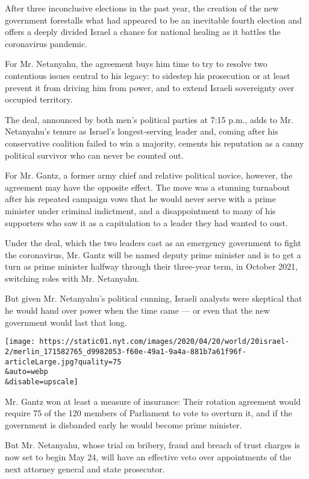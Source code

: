 After three inconclusive elections in the past year, the creation of the
new government forestalls what had appeared to be an inevitable fourth
election and offers a deeply divided Israel a chance for national
healing as it battles the coronavirus pandemic.

For Mr. Netanyahu, the agreement buys him time to try to resolve two
contentious issues central to his legacy: to sidestep his prosecution or
at least prevent it from driving him from power, and to extend Israeli
sovereignty over occupied territory.

The deal, announced by both men's political parties at 7:15 p.m., adds
to Mr. Netanyahu's tenure as Israel's longest-serving leader and, coming
after his conservative coalition failed to win a majority, cements his
reputation as a canny political survivor who can never be counted out.

For Mr. Gantz, a former army chief and relative political novice,
however, the agreement may have the opposite effect. The move was a
stunning turnabout after his repeated campaign vows that he would never
serve with a prime minister under criminal indictment, and a
disappointment to many of his supporters who saw it as a capitulation to
a leader they had wanted to oust.

Under the deal, which the two leaders cast as an emergency government to
fight the coronavirus, Mr. Gantz will be named deputy prime minister and
is to get a turn as prime minister halfway through their three-year
term, in October 2021, switching roles with Mr. Netanyahu.

But given Mr. Netanyahu's political cunning, Israeli analysts were
skeptical that he would hand over power when the time came --- or even
that the new government would last that long.

\texttt{[image: https://static01.nyt.com/images/2020/04/20/world/20israel-2/merlin\_171582765\_d9982053-f60e-49a1-9a4a-881b7a61f96f-articleLarge.jpg?quality=75\\\&auto=webp\\\&disable=upscale]}

Mr. Gantz won at least a measure of insurance: Their rotation agreement
would require 75 of the 120 members of Parliament to vote to overturn
it, and if the government is disbanded early he would become prime
minister.

But Mr. Netanyahu, whose trial on bribery, fraud and breach of trust
charges is now set to begin May 24, will have an effective veto over
appointments of the next attorney general and state prosecutor.

